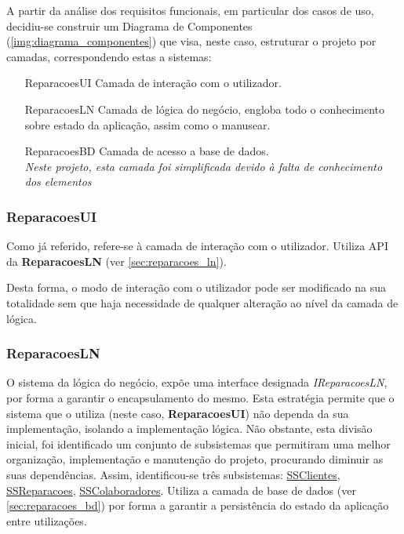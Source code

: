 \documentclass[../relatorio.tex]{subfiles}
\begin{document}
A partir da análise dos requisitos funcionais, em particular dos casos de uso,
decidiu-se construir um Diagrama de Componentes (\ref{img:diagrama_componentes}) que visa, neste caso,
estruturar o projeto por camadas, correspondendo estas a sistemas:
\begin{itemize}
    \item[ReparacoesUI]{
          Camada de interação com o utilizador.
          }
    \item[ReparacoesLN]{
          Camada de lógica do negócio, engloba todo o conhecimento sobre estado
          da aplicação, assim como o manusear.
          }
    \item[ReparacoesBD] {
          Camada de acesso a base de dados. \\
          \textit{Neste projeto, esta camada foi simplificada devido
              à falta de conhecimento dos elementos}
          }
\end{itemize}

\subsubsection*{ReparacoesUI} \label{sec:reparacoes_ui}
Como já referido, refere-se à camada de interação com o utilizador.
Utiliza API da \textbf{ReparacoesLN} (ver \ref{sec:reparacoes_ln}).

Desta forma, o modo de interação com o utilizador pode ser modificado na sua totalidade
sem que haja necessidade de qualquer alteração ao nível da camada de lógica.

\subsubsection*{ReparacoesLN} \label{sec:reparacoes_ln}
O sistema da lógica do negócio, expõe uma interface designada \textit{IReparacoesLN}, por forma a garantir o encapsulamento do mesmo.
Esta estratégia permite que o sistema que o utiliza (neste caso, \textbf{ReparacoesUI})
não dependa da sua implementação, isolando a implementação lógica.
Não obstante, esta divisão inicial, foi identificado um conjunto de subsistemas que permitiram
uma melhor organização, implementação e manutenção do projeto, procurando diminuir as suas dependências.
Assim, identificou-se três subsistemas: \underline{SSClientes}, \underline{SSReparacoes}, \underline{SSColaboradores}.
Utiliza a camada de base de dados (ver \ref{sec:reparacoes_bd}) por forma a garantir a persistência do estado da
aplicação entre utilizações.
\end{document}
